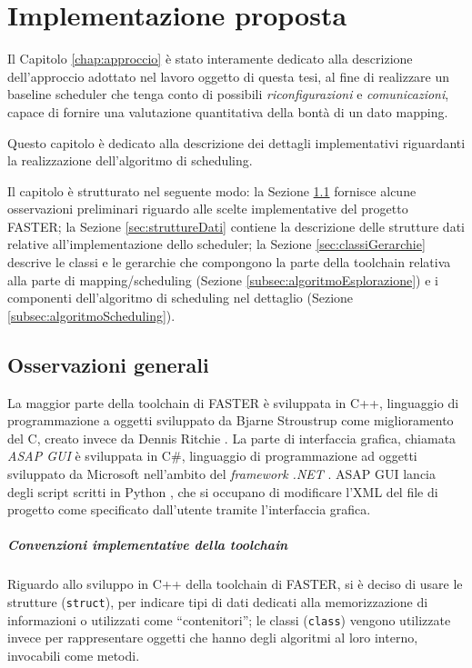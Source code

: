 \chapter{Implementazione proposta}
\label{chap:implementazione}
\vspace{1cm}
Il Capitolo \ref{chap:approccio} è stato interamente dedicato alla descrizione 
dell'approccio adottato nel lavoro oggetto di questa tesi, al fine di 
realizzare un baseline scheduler che tenga conto di possibili 
\emph{riconfigurazioni} e \emph{comunicazioni}, capace di fornire una 
valutazione quantitativa della bontà di un dato mapping.

Questo capitolo è dedicato alla descrizione dei dettagli implementativi 
riguardanti la realizzazione dell'algoritmo di scheduling.

Il capitolo è strutturato nel seguente modo: la Sezione 
\ref{sec:osservazioniGenerali} fornisce alcune osservazioni preliminari 
riguardo alle scelte implementative del progetto \ac{FASTER}; la Sezione 
\ref{sec:struttureDati} contiene la descrizione delle strutture dati relative 
all'implementazione dello scheduler; la Sezione \ref{sec:classiGerarchie} 
descrive le classi e le gerarchie che compongono la parte della toolchain 
relativa alla parte di mapping/scheduling (Sezione 
\ref{subsec:algoritmoEsplorazione}) e i componenti dell'algoritmo di scheduling 
nel dettaglio (Sezione \ref{subsec:algoritmoScheduling}).

\section{Osservazioni generali}
\label{sec:osservazioniGenerali}
La maggior parte della toolchain di \ac{FASTER} è sviluppata in C++, 
linguaggio di programmazione a oggetti sviluppato da Bjarne Stroustrup 
\cite{CppStroustrup} come miglioramento del C, creato invece da Dennis Ritchie 
\cite{CKernighanRitchie}. La parte di interfaccia grafica, chiamata \emph{ASAP 
GUI} è sviluppata in C\#, linguaggio di programmazione ad oggetti sviluppato da 
Microsoft nell'ambito del \emph{framework .NET} \cite{ProCSharp}. ASAP GUI 
lancia degli script scritti in Python \cite{ThinkPython}, che si occupano di 
modificare l'XML del file di progetto come specificato dall'utente tramite 
l'interfaccia grafica.
\paragraph{Convenzioni implementative della toolchain}
Riguardo allo sviluppo in C++ della toolchain di \ac{FASTER}, si è deciso di 
usare le strutture (\verb+struct+), per indicare tipi di dati dedicati alla 
memorizzazione di informazioni o utilizzati come ``contenitori''; le classi 
(\verb+class+) vengono utilizzate invece per rappresentare oggetti che hanno 
degli algoritmi al loro interno, invocabili come metodi.


